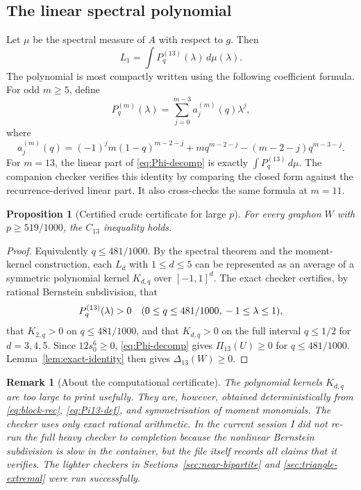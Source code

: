 \documentclass[11pt]{article}
\newtheorem{proposition}[theorem]{Proposition}
\newtheorem{remark}[theorem]{Remark}
\begin{document}
\subsection{The linear spectral polynomial}

Let $\mu$ be the spectral measure of $A$ with respect to $g$.  Then
\[
        L_1=\int P_q^{(13)}(\lambda)\,d\mu(\lambda).
\]
The polynomial is most compactly written using the following coefficient
formula.  For odd $m\ge5$, define
\begin{equation}\label{eq:Pqm-general}
        P_q^{(m)}(\lambda)=\sum_{j=0}^{m-3}a_j^{(m)}(q)\lambda^j,
\end{equation}
where
\begin{equation}\label{eq:aj-general}
        a_j^{(m)}(q)=(-1)^j m(1-q)^{m-2-j}
        +m q^{m-2-j}-(m-2-j)q^{m-3-j}.
\end{equation}
For $m=13$, the linear part of \eqref{eq:Phi-decomp} is exactly
$\int P_q^{(13)}\,d\mu$.  The companion checker verifies this identity by
comparing the closed form against the recurrence-derived linear part.  It also
cross-checks the same formula at $m=11$.

\begin{proposition}[Certified crude certificate for large $p$]\label{prop:path-large-p}
For every graphon $W$ with $p\ge519/1000$, the $C_{13}$ inequality holds.
\end{proposition}

\begin{proof}
Equivalently $q\le481/1000$.  By the spectral theorem and the moment-kernel
construction, each $L_d$ with $1\le d\le5$ can be represented as an average of a
symmetric polynomial kernel $K_{d,q}$ over $[-1,1]^d$.  The exact checker
certifies, by rational Bernstein subdivision, that
\[
        P_q^{(13)}(\lambda)>0\quad
        (0\le q\le481/1000,\\ -1\le\lambda\le1),
\]
that $K_{2,q}>0$ on $q\le481/1000$, and that $K_{d,q}>0$ on the full interval
$q\le1/2$ for $d=3,4,5$.  Since $12s_0^6\ge0$, \eqref{eq:Phi-decomp} gives
$\Pi_{13}(U)\ge0$ for $q\le481/1000$.  Lemma~\ref{lem:exact-identity} then gives
$\Delta_{13}(W)\ge0$.
\end{proof}

\begin{remark}[About the computational certificate]
The polynomial kernels $K_{d,q}$ are too large to print usefully.  They are,
however, obtained deterministically from \eqref{eq:block-rec},
\eqref{eq:Pi13-def}, and symmetrisation of moment monomials.  The checker uses
only exact rational arithmetic.  In the current session I did not re-run the
full heavy checker to completion because the nonlinear Bernstein subdivision is
slow in the container, but the file itself records all claims that it verifies.
The lighter checkers in Sections~\ref{sec:near-bipartite} and
\ref{sec:triangle-extremal} were run successfully.
\end{remark}
\end{document}
